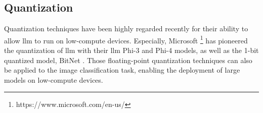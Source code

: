 \subsection{Quantization}
\label{sec:rw:quantization}

Quantization techniques have been highly regarded recently for their ability
to allow \gls*{llm} to run on low-compute devices.
Especially, Microsoft \footnote{https://www.microsoft.com/en-us/} has pioneered the quantization of \gls*{llm}
with their \gls*{llm} Phi-3 \cite{microsoft_phi3} and Phi-4 \cite{microsoft_phi4} models,
as well as the 1-bit quantized model, BitNet \cite{microsoft_bitnet}.
Those floating-point quantization techniques can also be applied to the image classification task,
enabling the deployment of large models on low-compute devices.